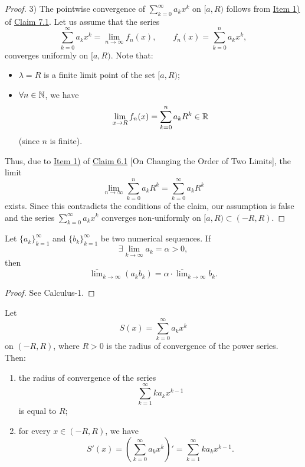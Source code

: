 \begin{proof}
3) The pointwise convergence of $\sum_{k=0}^{\infty}a_kx^k$ on $[a,R)$ follows from \hyperref[item:claim:7.1:1]{Item 1)} of \hyperref[claim:7.1]{Claim 7.1}.
Let us assume that the series
\[
\sum_{k=0}^{\infty}a_kx^k
=
\lim_{n\to\infty}f_n(x),
\qquad
f_n(x)=\sum_{k=0}^{n}a_kx^k,
\]
converges uniformly on $[a,R)$.
Note that:
\begin{itemize}
    \item $\lambda=R$ is a finite limit point of the set $[a,R)$;
    \item $\forall n\in\mathbb{N}$, we have
    \[
    \lim_{x\to R}f_n(x)=\sum_{k=0}^{n}a_kR^k\in\mathbb{R}
    \]
    (since $n$ is finite).
\end{itemize}
Thus, due to \hyperref[item:claim:6.1:1]{Item 1)} of \hyperref[claim:6.1]{Claim 6.1} [On Changing the Order of Two Limits], the limit
\[
\lim_{n\to\infty}\sum_{k=0}^{n}a_kR^k
=
\sum_{k=0}^{\infty}a_kR^k
\]
exists. Since this contradicts the conditions of the claim, our assumption is false and the series $\sum_{k=0}^{\infty}a_kx^k$ converges non-uniformly on $[a,R)\subset(-R,R)$.
\end{proof}

\begin{claim}\label{claim:7.4}
Let $\{a_k\}_{k=1}^{\infty}$ and $\{b_k\}_{k=1}^{\infty}$ be two numerical sequences.
If
\[
\exists\lim_{k\to\infty}a_k=\alpha>0,
\]
then
\[
\overline{\lim}_{k\to\infty}(a_kb_k)
=
\alpha\cdot\overline{\lim}_{k\to\infty}b_k.
\]
\end{claim}

\begin{proof}
See Calculus-1.
\end{proof}

\begin{claim}\label{claim:7.5}
Let
\[
S(x)=\sum_{k=0}^{\infty}a_kx^k
\]
on $(-R,R)$, where $R>0$ is the radius of convergence of the power series.
Then:
\begin{enumerate}
    \item\label{item:claim:7.5:1} the radius of convergence of the series
    \[
    \sum_{k=1}^{\infty}ka_kx^{k-1}
    \]
    is equal to $R$;

    \item\label{item:claim:7.5:2} for every $x\in(-R,R)$, we have
    \[
    S'(x)
    =
    \left(\sum_{k=0}^{\infty}a_kx^k\right)'
    =
    \sum_{k=1}^{\infty}ka_kx^{k-1}.
    \tag{3}\label{eq:7:3:1}
    \]
\end{enumerate}
\end{claim}

